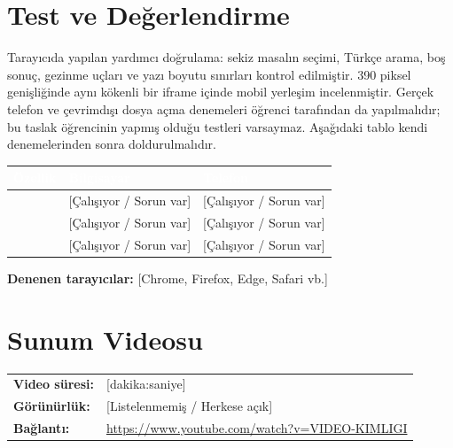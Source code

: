 \documentclass[12pt,a4paper]{article}
\newcommand{\youtubelink}{\url{https://www.youtube.com/watch?v=VIDEO-KIMLIGI}}
\begin{document}
\section{Test ve Değerlendirme}
Tarayıcıda yapılan yardımcı doğrulama: sekiz masalın seçimi, Türkçe arama,
boş sonuç, gezinme uçları ve yazı boyutu sınırları kontrol edilmiştir.
390 piksel genişliğinde aynı kökenli bir iframe içinde mobil yerleşim
incelenmiştir. Gerçek telefon ve çevrimdışı dosya açma denemeleri öğrenci
tarafından da yapılmalıdır; bu taslak öğrencinin yapmış olduğu testleri
varsaymaz. Aşağıdaki tablo kendi denemelerinden sonra doldurulmalıdır.



\begin{center}
\begin{tabular}{@{}p{6cm}p{3.4cm}p{3.4cm}@{}}
\toprule
\rowcolor{ana}\textcolor{white}{\textbf{Özellik}} & \textcolor{white}{\textbf{Bilgisayar}} & \textcolor{white}{\textbf{Telefon}} \\
\midrule
\relax[Özellik 1] & [Çalışıyor / Sorun var] & [Çalışıyor / Sorun var] \\
\relax[Özellik 2] & [Çalışıyor / Sorun var] & [Çalışıyor / Sorun var] \\
\relax[Özellik 3] & [Çalışıyor / Sorun var] & [Çalışıyor / Sorun var] \\
\bottomrule
\end{tabular}
\end{center}

\textbf{Denenen tarayıcılar:} [Chrome, Firefox, Edge, Safari vb.]

\section{Sunum Videosu}
\begin{center}
\begin{tabular}{@{}ll@{}}
\textbf{Video süresi:} & [dakika:saniye] \quad  \\
\textbf{Görünürlük:} & [Listelenmemiş / Herkese açık] \\
\textbf{Bağlantı:} & \youtubelink \\
\end{tabular}
\end{center}
\end{document}
